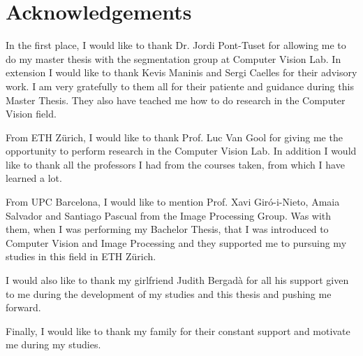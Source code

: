 
\chapter*{Acknowledgements}
\label{cha:ack}

In the first place, I would like to thank Dr. Jordi Pont-Tuset for allowing me to do my master thesis with the segmentation group at Computer Vision Lab. In extension I would like to thank Kevis Maninis and Sergi Caelles for their advisory work. I am very gratefully to them all for their patiente and guidance during this Master Thesis. They also have teached me how to do research in the Computer Vision field.

From ETH Z\"urich, I would like to thank Prof. Luc Van Gool for giving me the opportunity to perform research in the Computer Vision Lab.
In addition I would like to thank all the professors I had from the courses taken, from which I have learned a lot.

From UPC Barcelona, I would like to mention Prof. Xavi Gir\'o-i-Nieto, Amaia Salvador and Santiago Pascual from the Image Processing Group. 
Was with them, when I was performing my Bachelor Thesis, that I was introduced to Computer Vision and Image Processing and they supported me to pursuing my studies in this field in ETH Z\"urich.

I would also like to thank my girlfriend Judith Bergad\`a for all his support given to me during the development of my studies and this thesis and pushing me forward.

Finally, I would like to thank my family for their constant support and motivate me during my studies. 
